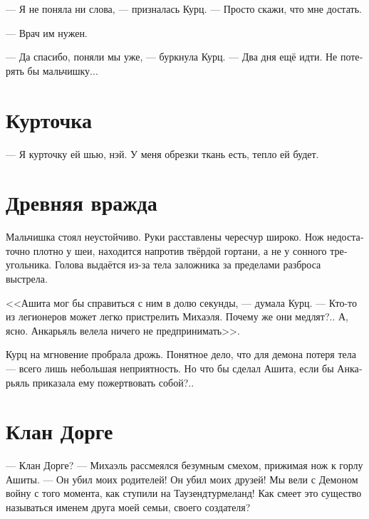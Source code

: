 \documentclass[a4paper,12pt,fleqn]{book}\usepackage{polyglossia}\setdefaultlanguage[babelshorthands=true]{russian}\setotherlanguage{english}\defaultfontfeatures{Ligatures=TeX,Mapping=tex-text}\usepackage{xcolor}\newcommand{\ml}[3]{#2}
\begin{document}
--- Я не поняла ни слова, --- призналась Курц.
--- Просто скажи, что мне достать.

--- Врач им нужен.

--- Да спасибо, поняли мы уже, --- буркнула Курц.
--- Два дня ещё идти.
Не потерять бы мальчишку...

\section{Курточка}

--- Я курточку ей шью, нэй.
У меня обрезки ткань есть, тепло ей будет.

\section{Древняя вражда}

Мальчишка стоял неустойчиво.
Руки расставлены чересчур широко.
Нож недостаточно плотно у шеи, находится напротив твёрдой гортани, а не у сонного треугольника.
Голова выдаётся из-за тела заложника за пределами разброса выстрела.

\ml{$0$}
{<<Ашита мог бы справиться с ним в долю секунды, --- думала Курц.}
{\textit{Ashita could handle him in a split second,} Kurz thought.}
\ml{$0$}
{--- Кто-то из легионеров может легко пристрелить Михаэля.}
{\textit{One of the legionaires could easily shoot Michael.}}
\ml{$0$}
{Почему же они медлят?..}
{\textit{Why do they hesitate ...?}}
\ml{$0$}
{А, ясно.}
{\textit{Ah, I see.}}
\ml{$0$}
{Анкарьяль велела ничего не предпринимать>>.}
{\textit{Angaralle told no moves.}}

Курц на мгновение пробрала дрожь.
Понятное дело, что для демона потеря тела --- всего лишь небольшая неприятность.
Но что бы сделал Ашита, если бы Анкарьяль приказала ему пожертвовать собой?..

\section{Клан Дорге}

--- Клан Дорге? --- Михаэль рассмеялся безумным смехом, прижимая нож к горлу Ашиты.
\ml{$0$}
{--- Он убил моих родителей!}
{``It killed my parents!}
\ml{$0$}
{Он убил моих друзей!}
{It killed my friends!}
\ml{$0$}
{Мы вели с Демоном войну с того момента, как ступили на Таузендтурмеланд!}
{We were fighting the Demon since we landed Tausendt\"{u}rmeland!}
\ml{$0$}
{Как смеет это существо называться именем друга моей семьи, своего создателя?}
{How dare that thing to call itself the name of my family's friend, the name of its creator!''}
\end{document}
